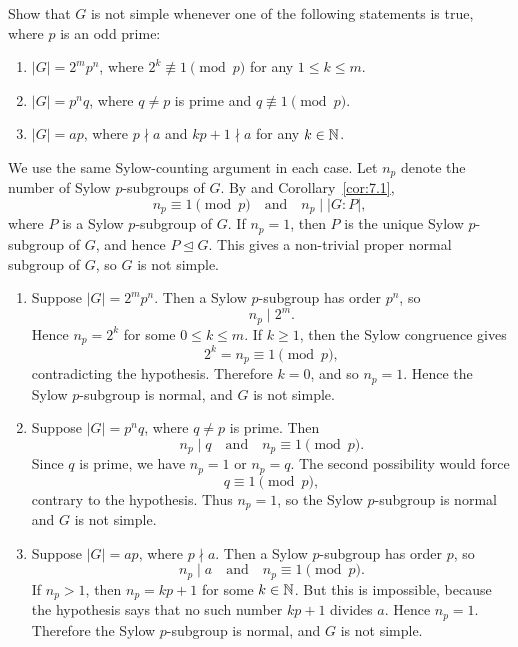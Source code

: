 \documentclass[../Odyssey_Project.tex]{subfiles}
\begin{document}
\begin{exercise}
\label{ex:7.9}
Show that $G$ is not simple whenever one of the following statements is true, where $p$ is an odd prime:
\begin{enumerate}
    \item[(a)] $|G| = 2^m p^n$, where $2^k \not\equiv 1 \pmod{p}$ for any $1 \leq k \leq m$.
    \item[(b)] $|G| = p^n q$, where $q \neq p$ is prime and $q \not\equiv 1 \pmod{p}$.
    \item[(c)] $|G| = ap$, where $p \nmid a$ and $kp + 1 \nmid a$ for any $k \in \mathbb{N}$.
\end{enumerate}
\end{exercise}
\begin{solution}
    We use the same Sylow-counting argument in each case. Let $n_p$ denote the number of Sylow $p$-subgroups of $G$. By  and Corollary~\ref{cor:7.1},
    \[
        n_p\equiv 1\pmod p
        \quad\text{and}\quad
        n_p \mid |G:P|,
    \]
    where $P$ is a Sylow $p$-subgroup of $G$. If $n_p=1$, then $P$ is the unique Sylow $p$-subgroup of $G$, and hence $P\trianglelefteq G$. This gives a non-trivial proper normal subgroup of $G$, so $G$ is not simple.
    \phantom{}\par
    \begin{enumerate}
        \item[(a)] Suppose $|G|=2^m p^n$. Then a Sylow $p$-subgroup has order $p^n$, so
        \[
            n_p \mid 2^m.
        \]
        Hence $n_p=2^k$ for some $0\leq k\leq m$. If $k\geq 1$, then the Sylow congruence gives
        \[
            2^k=n_p\equiv 1\pmod p,
        \]
        contradicting the hypothesis. Therefore $k=0$, and so $n_p=1$. Hence the Sylow $p$-subgroup is normal, and $G$ is not simple.
        \item[(b)] Suppose $|G|=p^nq$, where $q\neq p$ is prime. Then
        \[
            n_p\mid q
            \quad\text{and}\quad
            n_p\equiv 1\pmod p.
        \]
        Since $q$ is prime, we have $n_p=1$ or $n_p=q$. The second possibility would force
        \[
            q\equiv 1\pmod p,
        \]
        contrary to the hypothesis. Thus $n_p=1$, so the Sylow $p$-subgroup is normal and $G$ is not simple.
        \item[(c)] Suppose $|G|=ap$, where $p\nmid a$. Then a Sylow $p$-subgroup has order $p$, so
        \[
            n_p\mid a
            \quad\text{and}\quad
            n_p\equiv 1\pmod p.
        \]
        If $n_p>1$, then $n_p=kp+1$ for some $k\in\mathbb{N}$. But this is impossible, because the hypothesis says that no such number $kp+1$ divides $a$. Hence $n_p=1$. Therefore the Sylow $p$-subgroup is normal, and $G$ is not simple.
    \end{enumerate}
\end{solution}
\end{document}
